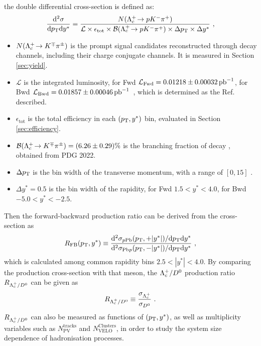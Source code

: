     the double differential cross-section is defined as:
    \begin{equation}\label{eqn:cross-def}
        \frac{\mathrm{d}^2 \sigma}{\mathrm{d} p_{\mathrm{T}} \mathrm{d} y^*}=
        \frac{N({{\Lambda}^+_{c}}\!\rightarrow {\ensuremath{p}}{\ensuremath{{K}^-}}{\ensuremath{{\pi}^+}})}
        {\mathcal{L}\times\epsilon_{\text{tot}}
        \times\mathcal{B}({{\Lambda}^+_{c}}\!\rightarrow {\ensuremath{p}}{\ensuremath{{K}^-}}{\ensuremath{{\pi}^+}})\times\Delta p_{\mathrm{T}} \times \Delta y^*}~,
    \end{equation}
    \begin{itemize}
        \item $N({{\Lambda}^+_{c}}\!\rightarrow {\ensuremath{{K}^\mp}}{\ensuremath{{\pi}^\pm}})$ is the prompt \Lc signal candidates
            reconstructed through \decay{\Lc}{\Kmp\pipm} decay channels,
            including their charge conjugate channels. It is measured in Section \ref{sec:yield}.
        \item $\mathcal{L}$ is the integrated luminosity,
            for Fwd $\mathcal{L_\mathrm{Fwd}}=0.01218\pm 0.00032\text{\,pb}^{-1}$,
            for Bwd$~\mathcal{L_\mathrm{Bwd}}=0.01857\pm 0.00046\text{\,pb}^{-1}$~,
            which is determined as the Ref. \cite{Aaij:1951625} described.
        \item $\epsilon_{\mathrm{tot}}$ is the total efficiency in each $(p_{\mathrm{T}}, y^*)$ bin,
            evaluated in Section \ref{sec:efficiency}.
        \item $\mathcal{B}({{\Lambda}^+_{c}}\!\rightarrow {\ensuremath{{K}^\mp}}{\ensuremath{{\pi}^\pm}})=(6.26\pm0.29)\%$
            is the branching fraction of decay \decay{\Lc}{\proton\Km\pip},
            obtained from PDG 2022\cite{PDG2022}.
        \item $\Delta p_{\mathrm{T}}$ is the bin width of the \Lc transverse momentum,
            with a \pt range of $[0,15]$ \gevc.
        \item $\Delta y^* = 0.5$ is the bin width of the \Lc rapidity, for Fwd $1.5 < y^* < 4.0$,
            for Bwd $-5.0 < y^* < -2.5$.
    \end{itemize}
    Then the forward-backward production ratio can be derived from the cross-section as
    \begin{equation}
        R_{\text{FB}}(p_{\mathrm{T}},y^*) \equiv \frac{\mathrm{d}^2\sigma_{p\text{Pb}}(p_{\mathrm{T}},+|y^*|)/\mathrm{d} p_{\mathrm{T}} \mathrm{d} y^*}{\mathrm{d}^2\sigma_{\text{Pb}p}(p_{\mathrm{T}},-|y^*|)/\mathrm{d} p_{\mathrm{T}} \mathrm{d} y^*}~,
    \end{equation}
    which is calculated among common rapidity bins $2.5 < |y^*| < 4.0$.
    By comparing the production cross-section with that \Dz meson,
    the ${{\Lambda}^+_{c}}/{{D}^0}$ production ratio $R_{{{\Lambda}^+_{c}}/{{D}^0}}$ can be given as
    \begin{equation}
        R_{{{\Lambda}^+_{c}}/{{D}^0}} \equiv \frac{\sigma_{{{\Lambda}^+_{c}}}}{\sigma_{{{D}^0}}}~.
    \end{equation}
    $R_{{{\Lambda}^+_{c}}/{{D}^0}}$ can also be measured as functions of $(p_{\mathrm{T}}, y^*)$,
    as well as multiplicity variables such as $N_{\mathrm{PV}}^{\mathrm{tracks}}$ and $N_{\mathrm{VELO}}^\mathrm{Clusters}$,
    in order to study the system size dependence of hadronisation processes.
